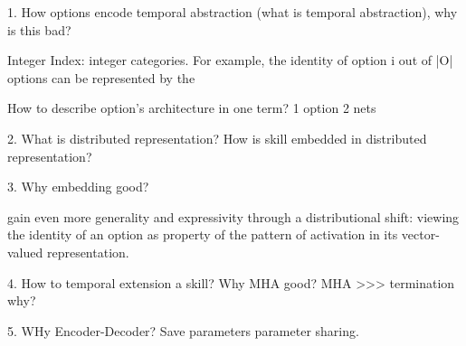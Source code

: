 \documentclass{article}
\begin{document}
1. How options encode temporal abstraction (what is temporal
abstraction), why is this bad?

Integer Index:
integer categories. For example, the identity of option i out of
|O| options can be represented by the

How to describe option's architecture in one term? 1 option 2 nets


2. What is distributed representation? How is skill embedded in
distributed representation?

3. Why embedding good?

gain even more generality and expressivity through a
distributional shift: viewing the identity of an option as
property of the pattern of activation in its vector-valued
representation.

4. How to temporal extension a skill? Why MHA good? MHA >>> termination why?


5. WHy Encoder-Decoder? Save parameters parameter sharing.







\end{document}
